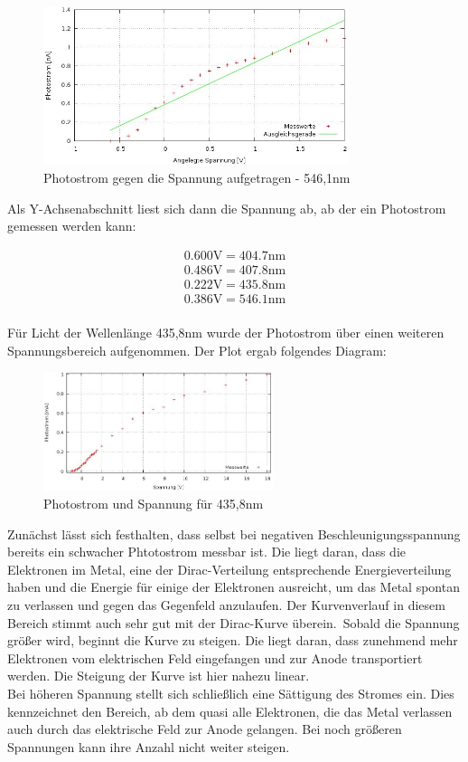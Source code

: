\begin{figure}[H]
\includegraphics[width=0.8\textwidth]{pics/wurzel546.jpg}
\caption{Photostrom gegen die Spannung aufgetragen - 546,1nm}
\end{figure}

Als Y-Achsenabschnitt liest sich dann die Spannung ab, ab der ein Photostrom gemessen werden kann:

\begin{align*}
0.600\text{V}	=	404.7\text{nm}\\
0.486\text{V}	=	407.8\text{nm}\\
0.222\text{V}	=	435.8\text{nm}\\
0.386\text{V}	=	546.1\text{nm}\\
\end{align*}

Für Licht der Wellenlänge 435,8nm wurde der Photostrom über einen weiteren Spannungsbereich aufgenommen. Der Plot ergab folgendes Diagram:

\begin{figure}[H]
\includegraphics[width=0.6\textwidth]{pics/gesamt.jpg}
\caption{Photostrom und Spannung für 435,8nm}
\end{figure}

Zunächst lässt sich festhalten, dass selbst bei negativen Beschleunigungsspannung bereits ein schwacher Phtotostrom messbar ist. Die liegt daran, dass die Elektronen im Metal, eine der Dirac-Verteilung entsprechende Energieverteilung haben und die Energie für einige der Elektronen ausreicht, um das Metal spontan zu verlassen und gegen das Gegenfeld anzulaufen. Der Kurvenverlauf in diesem Bereich stimmt auch sehr gut mit der Dirac-Kurve überein.\
Sobald die Spannung größer wird, beginnt die Kurve zu steigen. Die liegt daran, dass zunehmend mehr Elektronen vom elektrischen Feld eingefangen und zur Anode transportiert werden. Die Steigung der Kurve ist hier nahezu linear.\\
Bei höheren Spannung stellt sich schließlich eine Sättigung des Stromes ein. Dies kennzeichnet den Bereich, ab dem quasi alle Elektronen, die das Metal verlassen auch durch das elektrische Feld zur Anode gelangen. Bei noch größeren Spannungen kann ihre Anzahl nicht weiter steigen.

